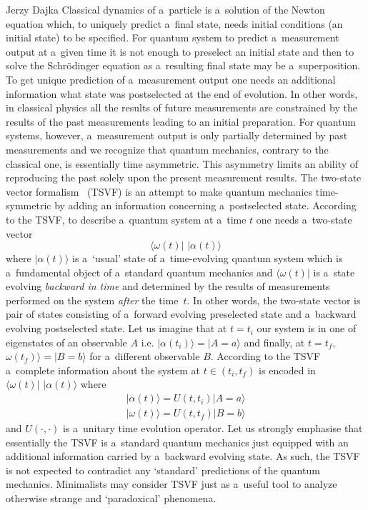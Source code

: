 \begin{artengenv}{Jerzy Dajka}
Classical dynamics of a~particle is a~solution of the Newton equation which, to uniquely predict a~final state, needs initial conditions (an initial state) to be specified. For quantum system to predict a~measurement output at a~given time it is not enough to preselect an initial state and then to solve the Schr\"{o}dinger equation as a~resulting final state may be a~superposition. To get unique prediction of a~measurement output one needs an additional information what state was postselected at the end of evolution.  In other words, in classical physics all the results of future measurements are constrained by the results of the past measurements leading to an initial preparation. For quantum systems, however, a~measurement output is only partially determined by past measurements and we recognize that quantum mechanics, contrary to the classical one, is essentially time asymmetric. This asymmetry limits an ability of reproducing the  past solely upon the present measurement results. The two-state vector formalism~\parencite{Aharonov2008} (TSVF) is an attempt to make quantum mechanics time-symmetric by adding an information concerning a~postselected state. According to the TSVF, to describe a~quantum system at a~time $t$ one needs a~two-state vector
\begin{equation}\label{tsv}
    \langle \omega(t)|\,\,|\alpha(t)\rangle
\end{equation}
where $|\alpha(t)\rangle$ is a~`usual' state of a~time-evolving quantum system which is a~fundamental object of a~standard quantum mechanics and $\langle\omega(t)|$ is a~state evolving {\it backward in time} and  determined by the results of measurements performed on the system {\it after} the time~$t$. In other words, the two-state vector is pair of states consisting of   a~forward evolving preselected state  and a~backward evolving postselected state. 
Let us imagine that at $t=t_i$ our system is in one of eigenstates of an observable $A$ i.e. $|\alpha(t_i)\rangle=|A=a\rangle$ and finally, at $t=t_f$, $\omega(t_f)\rangle=|B=b\rangle$ for a~different observable $B$. According to the TSVF a~complete information about the system at $t\in(t_i,t_f)$ is encoded in $\langle \omega(t)|\,\,|\alpha(t)\rangle$ where
\begin{equation}
   \begin{split}
       |\alpha(t)\rangle = U(t,t_i)|A=a\rangle\\
       |\omega(t)\rangle= U(t,t_f)|B=b\rangle
   \end{split}
\end{equation}
and $U(\cdot,\cdot)$ is a~unitary time evolution operator. 
Let us strongly emphasise that essentially the TSVF is a~standard quantum mechanics just equipped with an additional information carried by a~backward evolving state. As such, the TSVF is not expected to contradict any `standard' predictions of the quantum mechanics.  Minimalists may consider TSVF just as a~useful tool to analyze otherwise strange and `paradoxical' phenomena.   



\end{artengenv}
